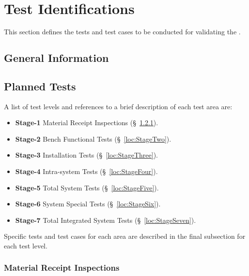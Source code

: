 
\chapter{Test Identifications}
\label{loc:TestIdentifications}


This section defines the tests and test cases to be conducted for validating the \ThisSys.

\section{General Information}
\label{loc:TestGeneralInformation}



\section{Planned Tests}
\label{loc:TestPlannedTests}


A list of test levels and references to a brief description of each test area are:
\begin{itemize}[itemindent=5pt,topsep=0pt,itemsep=0pt,partopsep=0pt, parsep=0pt]
	\item {\bf Stage-1} Material Receipt Inspections (\S~\ref{loc:StageOne}).
	\item {\bf Stage-2} Bench Functional Tests (\S~\ref{loc:StageTwo}).
	\item {\bf Stage-3} Installation Tests (\S~\ref{loc:StageThree}).
	\item {\bf Stage-4} Intra-system Tests (\S~\ref{loc:StageFour}).
	\item {\bf Stage-5} Total System Tests (\S~\ref{loc:StageFive}).
	\item {\bf Stage-6} System Special Tests (\S~\ref{loc:StageSix}).
	\item {\bf Stage-7} Total Integrated System Tests (\S~\ref{loc:StageSeven}).
\end{itemize}
Specific tests and test cases for each area are described in the final subsection for each test level.

\subsection{Material Receipt Inspections}
\label{loc:StageOne}
\newcommand{\TestIdName}{StageOne}%
\newcommand{\TestIdNameX}{StageOne\xspace}%


